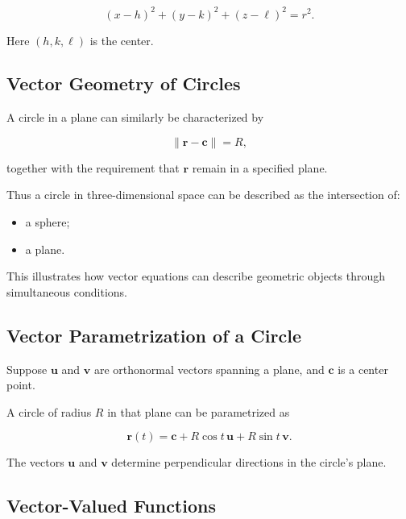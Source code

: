 \[
\boxed{
(x-h)^2+(y-k)^2+(z-\ell)^2=r^2.
}
\]

Here \((h,k,\ell)\) is the center.

\subsection{Vector Geometry of Circles}
\label{subsec:vector-geometry-circles}

A circle in a plane can similarly be characterized by

\[ \|\mathbf{r}-\mathbf{c}\|=R, \]

together with the requirement that \(\mathbf{r}\) remain in a specified
plane.

Thus a circle in three-dimensional space can be described as the
intersection of:

\begin{itemize}
    \item a sphere;
    \item a plane.
\end{itemize}

This illustrates how vector equations can describe geometric objects through
simultaneous conditions.

\subsection{Vector Parametrization of a Circle}
\label{subsec:vector-circle-parametrization}

Suppose \(\mathbf{u}\) and \(\mathbf{v}\) are orthonormal vectors spanning a
plane, and \(\mathbf{c}\) is a center point.

A circle of radius \(R\) in that plane can be parametrized as

\[
\boxed{
\mathbf{r}(t)
=
\mathbf{c}
+
R\cos t\,\mathbf{u}
+
R\sin t\,\mathbf{v}.
}
\]

The vectors \(\mathbf{u}\) and \(\mathbf{v}\) determine perpendicular
directions in the circle's plane.

\subsection{Vector-Valued Functions}
\label{subsec:vector-valued-functions-preview}

